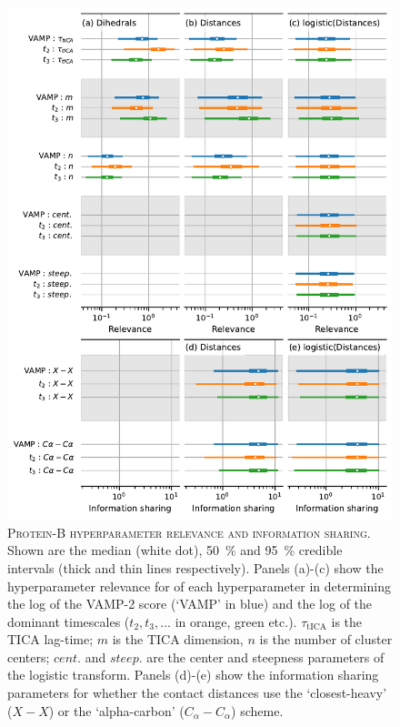 \documentclass{article}
\begin{document}
\begin{figure}[h]
    \centering
    \includegraphics[height=0.8\textheight]{figures/sensitivities/prb_sensitivity.pdf}
    \caption{\textsc{Protein-B hyperparameter relevance and information sharing}. Shown are the  median (white dot), \SI{50}{\percent} and \SI{95}{\percent} credible intervals (thick and thin lines respectively).  Panels (a)-(c) show the hyperparameter relevance for of each hyperparameter in determining the log of the VAMP-2 score (`VAMP' in blue) and the log of the dominant timescales ($t_{2}, t_{3}, ...$ in orange, green etc.). $\tau_{\mathrm{tICA}}$ is the TICA lag-time; $m$ is the TICA dimension, $n$ is the number of cluster centers; $cent.$ and $steep.$ are the center and steepness parameters of the logistic transform. Panels (d)-(e) show the information sharing parameters for whether the contact distances use the `closest-heavy' ($X-X$) or the `alpha-carbon' ($C_{\alpha}-C_{\alpha}$) scheme.}
    \label{fig:prb_sense}
\end{figure}
\end{document}
